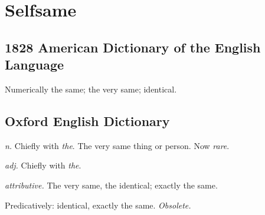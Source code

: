 \section{Selfsame}
	\label{SELFSAME}
	

\subsection{1828 American Dictionary of the English Language} %
	\label{SELFSAME-1828}

	\begin{compactitem}
		\item Numerically the same; the very same; identical.
	\end{compactitem}

\subsection{Oxford English Dictionary} %
	\label{SELFSAME-OED}

	\begin{compactitem}
		\item[A] \textit{n.} Chiefly with \textit{the}. The very same thing or person. Now \textit{rare}.
		\item[B] \textit{adj.} Chiefly with \textit{the}.
		\item[B.1] \textit{attributive.} The very same, the identical; exactly the same.
		\item[B.2] Predicatively: identical, exactly the same. \textit{Obsolete.}
	\end{compactitem}


	
